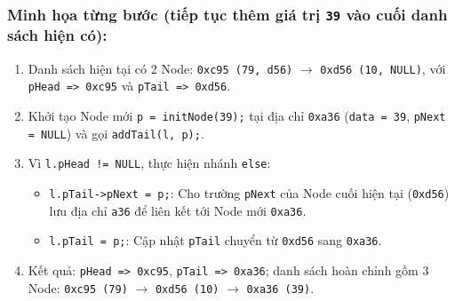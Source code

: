 \documentclass[12pt,a4paper]{article}
\begin{document}
\subsubsection*{Minh họa từng bước (tiếp tục thêm giá trị \texttt{39} vào cuối danh sách hiện có):}
\begin{enumerate}[itemsep=0.15em]
    \item Danh sách hiện tại có 2 Node: \texttt{0xc95 (79, d56)} $\rightarrow$ \texttt{0xd56 (10, NULL)}, với \texttt{pHead => 0xc95} và \texttt{pTail => 0xd56}.
    \item Khởi tạo Node mới \texttt{p = initNode(39);} tại địa chỉ \texttt{0xa36} (\texttt{data = 39}, \texttt{pNext = NULL}) và gọi \texttt{addTail(l, p);}.
    \item Vì \texttt{l.pHead != NULL}, thực hiện nhánh \texttt{else}:
    \begin{itemize}[itemsep=0.1em]
        \item \texttt{l.pTail->pNext = p;}: Cho trường \texttt{pNext} của Node cuối hiện tại (\texttt{0xd56}) lưu địa chỉ \texttt{a36} để liên kết tới Node mới \texttt{0xa36}.
        \item \texttt{l.pTail = p;}: Cập nhật \texttt{pTail} chuyển từ \texttt{0xd56} sang \texttt{0xa36}.
    \end{itemize}
    \item Kết quả: \texttt{pHead => 0xc95}, \texttt{pTail => 0xa36}; danh sách hoàn chỉnh gồm 3 Node: \texttt{0xc95 (79)} $\rightarrow$ \texttt{0xd56 (10)} $\rightarrow$ \texttt{0xa36 (39)}.
\end{enumerate}
\end{document}
